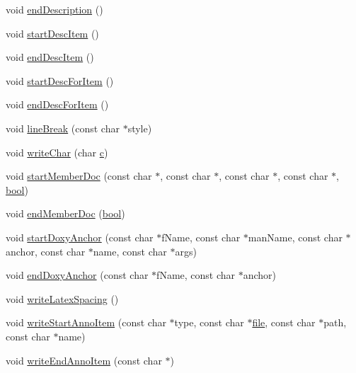\begin{DoxyCompactItemize}
void \hyperlink{class_html_generator_aff598e78fc1ebaefb21fe94fda564e4d}{end\+Description} ()
\item 
void \hyperlink{class_html_generator_a7a4d4ef015bc9d8298a6c023f85737c5}{start\+Desc\+Item} ()
\item 
void \hyperlink{class_html_generator_a0354681e6d39ae7da41d33f88656e335}{end\+Desc\+Item} ()
\item 
void \hyperlink{class_html_generator_a760684d94139338dc683a816a6d59e3d}{start\+Desc\+For\+Item} ()
\item 
void \hyperlink{class_html_generator_a67179d9c17833aacd71619f5046859b3}{end\+Desc\+For\+Item} ()
\item 
void \hyperlink{class_html_generator_a0931c48e06fde3d6fca0940261ea8e4f}{line\+Break} (const char $\ast$style)
\item 
void \hyperlink{class_html_generator_a71e6263d7ffef2cc600e289be06c4f33}{write\+Char} (char \hyperlink{060__command__switch_8tcl_ab14f56bc3bd7680490ece4ad7815465f}{c})
\item 
void \hyperlink{class_html_generator_ae893cf7910d9badc2e92a008317fc237}{start\+Member\+Doc} (const char $\ast$, const char $\ast$, const char $\ast$, const char $\ast$, \hyperlink{qglobal_8h_a1062901a7428fdd9c7f180f5e01ea056}{bool})
\item 
void \hyperlink{class_html_generator_a7f7fbce45b7f8eb55fb12fe3c4c1740a}{end\+Member\+Doc} (\hyperlink{qglobal_8h_a1062901a7428fdd9c7f180f5e01ea056}{bool})
\item 
void \hyperlink{class_html_generator_a677520cd44ba8306cbaf15387d34d1cd}{start\+Doxy\+Anchor} (const char $\ast$f\+Name, const char $\ast$man\+Name, const char $\ast$anchor, const char $\ast$name, const char $\ast$args)
\item 
void \hyperlink{class_html_generator_a30d8f13a6cd2cdebefe09ac764b6081e}{end\+Doxy\+Anchor} (const char $\ast$f\+Name, const char $\ast$anchor)
\item 
void \hyperlink{class_html_generator_a2dc6c95466bf497d2912cb15d184b53d}{write\+Latex\+Spacing} ()
\item 
void \hyperlink{class_html_generator_ae9cfa1c13442d21af2b84dd56ee9667d}{write\+Start\+Anno\+Item} (const char $\ast$type, const char $\ast$\hyperlink{class_output_generator_aed5ad11c3844cdf71ec6fee6c1c84286}{file}, const char $\ast$path, const char $\ast$name)
\item 
void \hyperlink{class_html_generator_a12fde29ab455bf9f9080a3b24fca5365}{write\+End\+Anno\+Item} (const char $\ast$)
\item 

\end{DoxyCompactItemize}
